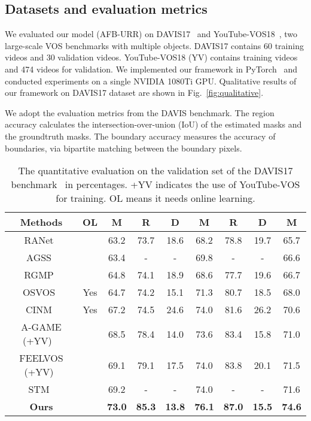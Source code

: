 \documentclass{article}
\begin{document}
\subsection{Datasets and evaluation metrics}

We evaluated our model (AFB-URR) on DAVIS17~\cite{pont-tuset_2017_2018} and YouTube-VOS18~\cite{xu_youtube-vos_2018}, two large-scale VOS benchmarks with multiple objects.
DAVIS17 contains 60 training videos and 30 validation videos.
YouTube-VOS18 (YV) contains  training videos and 474 videos for validation.
We implemented our framework in PyTorch~\cite{paszke2017automatic} and conducted experiments on a single NVIDIA 1080Ti GPU.
Qualitative results of our framework on DAVIS17 dataset are shown in Fig.~\ref{fig:qualitative}.

We adopt the evaluation metrics from the DAVIS benchmark.
The region accuracy  calculates the intersection-over-union (IoU) of the estimated masks and the groundtruth masks.
The boundary accuracy  measures the accuracy of boundaries, via bipartite matching between the boundary pixels.










\begin{table}
  \caption{The quantitative evaluation on the validation set of the DAVIS17 benchmark~\cite{pont-tuset_2017_2018} in percentages. +YV indicates the use of YouTube-VOS for training. OL means it needs online learning.}
  \label{tbl:DAVIS17}
  \centering
  \begin{tabular}{c|c|cccccc|c}
        \toprule
        Methods & OL &  M &  R &  D &  M &  R &  D &  M\\
\midrule
         RANet~\cite{wang_ranet_2019} &      & 63.2 & 73.7 & 18.6 & 68.2 & 78.8 & 19.7 & 65.7\\
         AGSS~\cite{lin_agss-vos_2019} &     & 63.4 & -    & -    & 69.8 & -    & -    & 66.6\\
         RGMP~\cite{oh_fast_2018} &          & 64.8 & 74.1 & 18.9 & 68.6 & 77.7 & 19.6 & 66.7\\
         OSVOS~\cite{maninis_video_2019} & Yes & 64.7 & 74.2 & 15.1 & 71.3 & 80.7 & 18.5 & 68.0\\
         CINM~\cite{bao_cnn_2018} & Yes      & 67.2 & 74.5 & 24.6 & 74.0 & 81.6 & 26.2 & 70.6\\
         A-GAME (+YV) ~\cite{johnander2019generative} & & 68.5 & 78.4 & 14.0 & 73.6 & 83.4 & 15.8 & 71.0\\
         FEELVOS (+YV)~\cite{voigtlaender2019feelvos} & & 69.1 & 79.1 & 17.5 & 74.0 & 83.8 & 20.1 &  71.5\\
         STM~\cite{oh_video_2019} &          & 69.2 & -    & -    & 74.0 & -    & -    & 71.6\\
         \textbf{Ours} &  & \textbf{73.0} & \textbf{85.3} & \textbf{13.8} & \textbf{76.1} & \textbf{87.0} & \textbf{15.5} & \textbf{74.6} \\
        \bottomrule
    \end{tabular}

\end{table}
\end{document}
